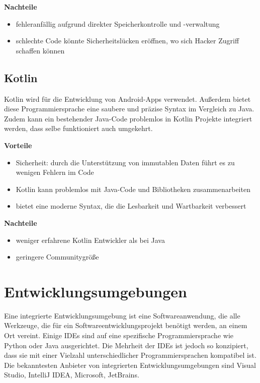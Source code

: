 \textbf{Nachteile}
\begin{itemize}
	\item fehleranfällig aufgrund direkter Speicherkontrolle und -verwaltung
	\item schlechte Code könnte Sicherheitslücken eröffnen, wo sich Hacker Zugriff schaffen können
\end{itemize}



\subsection{Kotlin}
Kotlin wird für die Entwicklung von Android-Apps verwendet. Außerdem bietet diese Programmiersprache eine saubere und präzise Syntax im Vergleich zu Java. Zudem kann ein bestehender Java-Code problemlos in Kotlin Projekte integriert werden, dass selbe funktioniert auch umgekehrt. \parencite{Kotlin}

\textbf{Vorteile}
\begin{itemize}
	\item Sicherheit: durch die Unterstützung von immutablen Daten führt es zu wenigen Fehlern im Code
	\item Kotlin kann problemlos mit Java-Code und Bibliotheken zusammenarbeiten
	\item bietet eine moderne Syntax, die die Lesbarkeit und Wartbarkeit verbessert
\end{itemize}

\textbf{Nachteile}
\begin{itemize}
	\item weniger erfahrene Kotlin Entwickler als bei Java
	\item geringere Communitygröße
\end{itemize}


\section{Entwicklungsumgebungen}
Eine integrierte Entwicklungsumgebung ist eine Softwareanwendung, die alle Werkzeuge, die für ein Softwareentwicklungsprojekt benötigt werden, an einem Ort vereint. Einige IDEs sind auf eine spezifische Programmiersprache wie Python oder Java ausgerichtet. Die Mehrheit der IDEs ist jedoch so konzipiert, dass sie mit einer Vielzahl unterschiedlicher Programmiersprachen kompatibel ist. Die bekanntesten Anbieter von integrierten Entwicklungsumgebungen sind Visual Studio, IntelliJ IDEA, Microsoft, JetBrains. 

